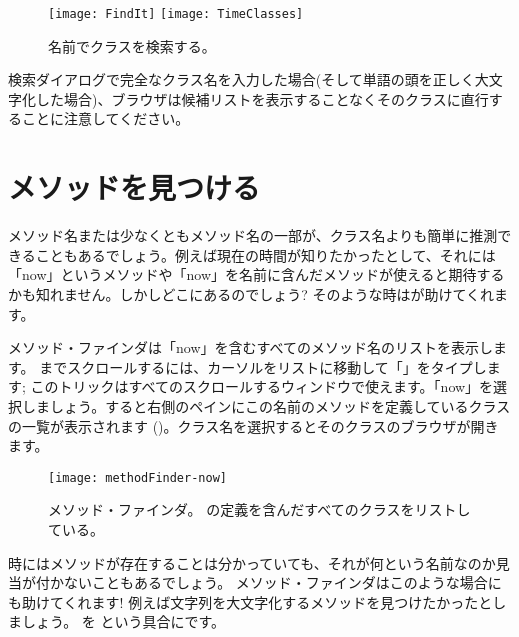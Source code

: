 \documentclass[a4paper,10pt,twoside]{book}
\begin{document}
\begin{figure}[hbt]
\centerline{
	\texttt{[image: FindIt]}
	\hspace{1cm}
	\texttt{[image: TimeClasses]}
}
\caption{名前でクラスを検索する。
}
\end{figure}

検索ダイアログで完全なクラス名を入力した場合(そして単語の頭を正しく大文字化した場合)、ブラウザは候補リストを表示することなくそのクラスに直行することに注意してください。

\section{メソッドを見つける}

メソッド名または少なくともメソッド名の一部が、クラス名よりも簡単に推測できることもあるでしょう。例えば現在の時間が知りたかったとして、それには「now」というメソッドや「now」を名前に含んだメソッドが使えると期待するかも知れません。しかしどこにあるのでしょう?
そのような時はが助けてくれます。

メソッド・ファインダは「now」を含むすべてのメソッド名のリストを表示します。
 までスクロールするには、カーソルをリストに移動して「」をタイプします; このトリックはすべてのスクロールするウィンドウで使えます。「now」を選択しましょう。すると右側のペインにこの名前のメソッドを定義しているクラスの一覧が表示されます ()。クラス名を選択するとそのクラスのブラウザが開きます。

\begin{figure}[hbt]
\centerline {\texttt{[image: methodFinder-now]}}
\caption{メソッド・ファインダ。 の定義を含んだすべてのクラスをリストしている。
}
\end{figure}

時にはメソッドが存在することは分かっていても、それが何という名前なのか見当が付かないこともあるでしょう。
メソッド・ファインダはこのような場合にも助けてくれます! 例えば文字列を大文字化するメソッドを見つけたかったとしましょう。 を  という具合にです。
\end{document}
